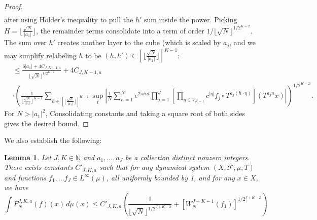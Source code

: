 \documentclass[11pt, oneside]{amsart}   	%
\newcommand{\1}{\mathbbm{1}}
\newcommand{\N}{\mathbb{N}}
\newcommand{\floor}[1]{\lfloor#1\rfloor}
\newtheorem{lemma}[theorem]{Lemma}
\theoremstyle{definition}
\begin{document}
\begin{proof}
\begin{align*}
\end{align*}
after using Hölder's inequality to pull the $h'$ sum inside the power. Picking $H = \floor{\frac{\sqrt{N}}{|a_1|}}$, the remainder terms consolidate into a term of order $1/\floor{\sqrt{N}}^{1/2^{K-2}}$. The sum over $h'$ creates another layer to the cube (which is scaled by $a_j$, and we may simplify relabeling $h$ to be $(h, h')\in [\floor{\frac{\sqrt{N}}{|a_1|}}]^{K-1}$:
\begin{align*}
&\leq \frac{6|a_1| + 4 C_{J, K-1, a}}{\floor{\sqrt{N}}^{1/2^{K-2}}} + 4 C_{J, K-1, a} \\
&  \cdot\left(\frac{1}{\floor{\frac{\sqrt{N}}{|a_1|}}^{K-1}} \sum_{h\in \left[\floor{\frac{\sqrt{N}}{|a_1|}}\right]^{K-1}} \sup_{t} \left| \frac{1}{N} \sum_{n=1}^N e^{2\pi i n t} \prod_{j=1}^J \left[ \prod_{\eta \in V_{K-1}} c^{|\eta|} f_j\circ T^{a_j(h \cdot \eta)} \right](T^{a_jn} x)\right|\right)^{1/2^{K-2}} \, .
\end{align*}
For $N > |a_1|^2$, Consolidating constants and taking a square root of both sides gives the desired bound.
\end{proof}

We also establish the following:
\begin{lemma}\label{T:intermediate 2}
Let $J, K\in \N$ and $a_1, \dots, a_J$ be a collection distinct nonzero integers. There exists constants $C'_{J, K, a}$ such that for any dynamical system $(X, \mathcal{F}, \mu, T)$ and functions $f_1, \dots f_J\in L^\infty(\mu)$, all uniformly bounded by 1, and for any $x\in X$, we have
$$\int F_N^{J, K, a}(f)(x) \, d\mu(x) \leq C'_{J, K, a} \left( \frac{1}{\floor{\sqrt{N}}^{1/2^{J+K-2}}} + \left[ W_N^{J+K-1} (f_1)\right]^{1/2^{J+K-2}}\right)$$
\end{lemma}
\end{document}
